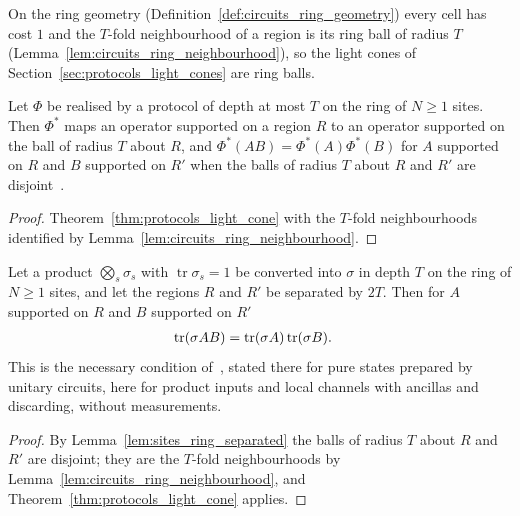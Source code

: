 On the ring geometry (Definition~\ref{def:circuits_ring_geometry}) every cell has cost $1$
and the $T$-fold neighbourhood of a region is its ring ball of radius $T$
(Lemma~\ref{lem:circuits_ring_neighbourhood}), so the light cones of
Section~\ref{sec:protocols_light_cones} are ring balls.

\begin{theorem}
    \label{thm:protocols_ring_light_cone}
    \leanok
    Let $\Phi$ be realised by a protocol of depth at most $T$ on the ring of $N\ge1$ sites.
    Then $\Phi^*$ maps an operator supported on a region $R$ to an operator supported on the
    ball of radius $T$ about $R$, and $\Phi^*(AB)=\Phi^*(A)\Phi^*(B)$ for $A$ supported on
    $R$ and $B$ supported on $R'$ when the balls of radius $T$ about $R$ and $R'$ are
    disjoint~\cite{Malz2024Preparation}.
\end{theorem}
\begin{proof}\leanok
    Theorem~\ref{thm:protocols_light_cone} with the $T$-fold neighbourhoods identified by
    Lemma~\ref{lem:circuits_ring_neighbourhood}.
\end{proof}

\begin{theorem}
    \label{thm:protocols_ring_correlations}
    \leanok
    Let a product $\bigotimes_s\sigma_s$ with $\operatorname{tr}\sigma_s=1$ be converted into
    $\sigma$ in depth $T$ on the ring of $N\ge1$ sites, and let the regions $R$ and $R'$ be
    separated by $2T$. Then for $A$ supported on $R$ and $B$ supported on $R'$
    \begin{align}
        \operatorname{tr}(\sigma AB)&=\operatorname{tr}(\sigma A)\operatorname{tr}(\sigma B).
        \notag
    \end{align}
    This is the necessary condition of~\cite[Proposition~2]{Piroli2021LOCC}, stated there for
    pure states prepared by unitary circuits, here for product inputs and local channels with
    ancillas and discarding, without measurements.
\end{theorem}
\begin{proof}\leanok
    By Lemma~\ref{lem:sites_ring_separated} the balls of radius $T$ about $R$ and $R'$ are
    disjoint; they are the $T$-fold neighbourhoods by
    Lemma~\ref{lem:circuits_ring_neighbourhood}, and Theorem~\ref{thm:protocols_light_cone}
    applies.
\end{proof}


